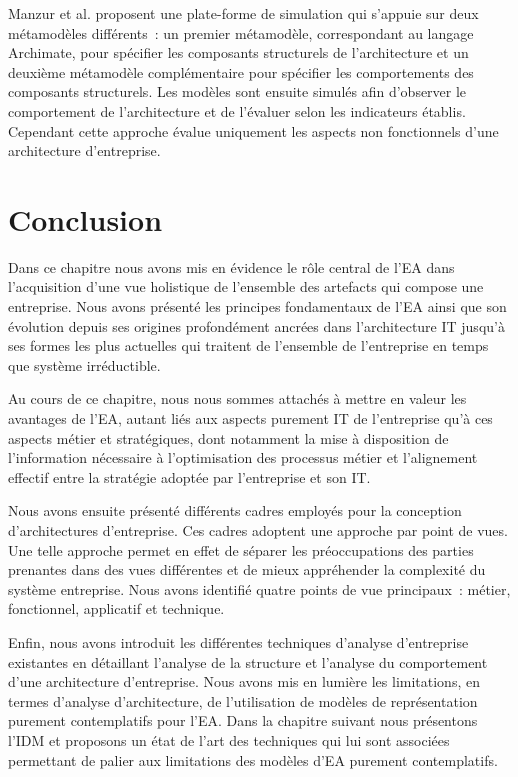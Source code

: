 Manzur et al. \cite{manzur2015xarchimate} proposent une plate-forme de simulation qui s'appuie sur deux métamodèles différents~: un premier métamodèle, correspondant au
langage Archimate, pour spécifier les composants structurels de l'architecture
et un deuxième métamodèle complémentaire pour spécifier les comportements des
composants structurels. Les modèles sont ensuite simulés afin d'observer le
comportement de l'architecture et de l'évaluer selon les indicateurs établis.
Cependant cette approche évalue uniquement les aspects non fonctionnels d'une
architecture d'entreprise.


\section{Conclusion}
Dans ce chapitre nous avons mis en évidence le rôle central de l'EA dans l'acquisition
d'une vue holistique de l'ensemble des artefacts qui compose une entreprise. Nous avons présenté
les principes fondamentaux de l'EA ainsi que son évolution depuis ses origines profondément
ancrées dans l'architecture IT jusqu'à ses formes les plus actuelles qui traitent de l'ensemble de l'entreprise
en temps que système irréductible. 

Au cours de ce chapitre, nous nous sommes attachés à mettre en valeur les avantages de l'EA, autant liés
aux aspects purement IT de l'entreprise qu'à ces aspects métier et stratégiques, dont notamment la mise à
disposition de l'information nécessaire à l'optimisation des processus métier et l'alignement effectif entre la stratégie
adoptée par l'entreprise et son IT. 

Nous avons ensuite présenté différents cadres employés pour la conception d'architectures d'entreprise. Ces cadres
adoptent une approche par point de vues. Une telle approche
permet en effet de séparer les préoccupations des parties prenantes dans des vues différentes et de mieux
appréhender la complexité du système entreprise. Nous avons identifié quatre points de vue principaux~: métier, fonctionnel,
applicatif et technique.
 
Enfin, nous avons introduit les différentes techniques d'analyse d'entreprise existantes en détaillant l'analyse de la structure
et l'analyse du comportement d'une architecture d'entreprise. Nous avons mis en lumière les limitations, en termes d'analyse d'architecture,
de  l'utilisation de modèles de représentation purement contemplatifs pour l'EA. 
Dans la chapitre suivant nous présentons l'IDM et proposons un état de l'art des techniques qui lui sont associées permettant
de palier aux limitations des modèles d'EA purement contemplatifs. 



